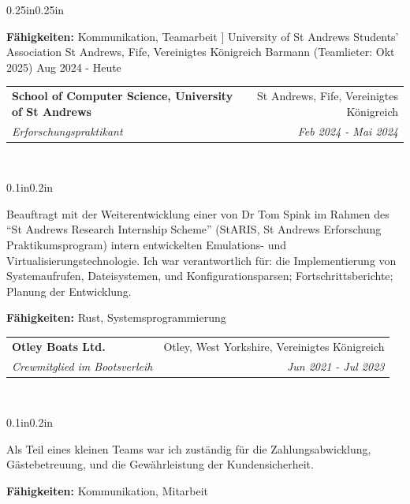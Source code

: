 \documentclass[a4paper]{article}
\makeatletter
\newcommand{\resumeSubheading}[5][]{
  \vspace{2pt}\item
    \begin{tabular*}{0.875\textwidth}[t]{l@{\extracolsep{\fill}}r}
      \textbf{#2} & #3 \\
      \textit{\small#4} & \textit{\small #5} \\
    \end{tabular*}\\
    \vspace{-5pt}
    \begin{adjustwidth}{0.1in}{0.2in}
      #1
    \end{adjustwidth}
    \vspace{10pt}
}
\makeatother
\begin{document}
\begin{adjustwidth}{0.25in}{0.25in}
{        \textbf{Fähigkeiten:} {Kommunikation, Teamarbeit}
      ]
        {University of St Andrews Students' Association}
        {St Andrews, Fife, Vereinigtes Königreich}
        {Barmann (Teamlieter: Okt 2025)}
        {Aug 2024 {-} Heute}
      \resumeSubheading[
        Beauftragt mit der Weiterentwicklung einer von Dr Tom Spink im Rahmen
        des ``St Andrews Research Internship Scheme'' (StARIS, St Andrews
        Erforschung Praktikumsprogram) intern entwickelten Emulations- und
        Virtualisierungstechnologie. Ich war verantwortlich für: die
        Implementierung von Systemaufrufen, Dateisystemen, und
        Konfigurationsparsen; Fortschrittsberichte; Planung der Entwicklung.

        \textbf{Fähigkeiten:} {Rust, Systemsprogrammierung}
      ]
        {School of Computer Science, University of St Andrews}
        {St Andrews, Fife, Vereinigtes Königreich}
        {Erforschungspraktikant}
        {Feb 2024 {-} Mai 2024}
      \resumeSubheading[
        Als Teil eines kleinen Teams war ich zuständig für die
        Zahlungsabwicklung, Gästebetreuung, und die Gewährleistung der
        Kundensicherheit.

        \textbf{Fähigkeiten:} {Kommunikation, Mitarbeit}
      ]
        {Otley Boats Ltd.}
        {Otley, West Yorkshire, Vereinigtes Königreich}
        {Crewmitglied im Bootsverleih}
        {Jun 2021 {-} Jul 2023}
    }

  \newpage{}


\end{adjustwidth}
\end{document}
